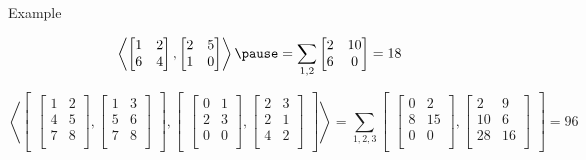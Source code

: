\documentclass{beamer}
\begin{document}
\begin{frame}{Example}

$$
\left\langle
\begin{bmatrix}
1 & 2\\ 6 & 4
\end{bmatrix}
,
\begin{bmatrix}
2 & 5\\ 1 & 0
\end{bmatrix}
\right\rangle
\pause
=
\sum_{1,2}
\begin{bmatrix}
2 & 10\\ 6 & 0
\end{bmatrix}
=
18
$$

\begin{footnotesize}
$$
\left\langle
\begin{bmatrix}
\begin{bmatrix}
1& 2\\
4& 5\\
7& 8\\
\end{bmatrix}
,
\begin{bmatrix}
1& 3\\
5& 6\\
7& 8\\
\end{bmatrix}
\end{bmatrix}
,
\begin{bmatrix}
\begin{bmatrix}
0& 1\\
2& 3\\
0& 0\\
\end{bmatrix}
,
\begin{bmatrix}
2& 3\\
2& 1\\
4& 2\\
\end{bmatrix}
\end{bmatrix}
\right\rangle
=
\sum_{1,2,3}
\begin{bmatrix}
\begin{bmatrix}
0& 2\\
8& 15\\
0& 0\\
\end{bmatrix}
,
\begin{bmatrix}
2& 9\\
10& 6\\
28& 16\\
\end{bmatrix}
\end{bmatrix}
=
96
$$
\end{footnotesize}
    
\end{frame}
\end{document}
